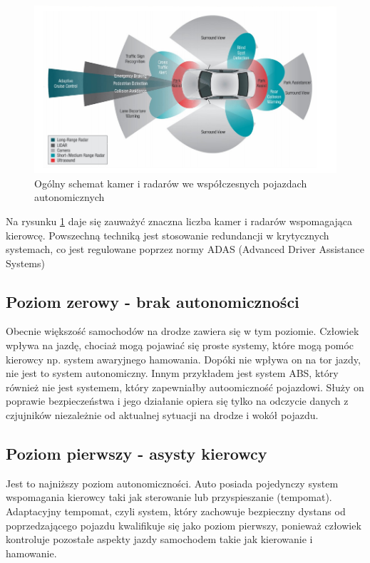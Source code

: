 \begin{figure}
  \centering
  \includegraphics[width=13cm]{img/systemy_autonomiczne_ogolnie.png}
  \caption{Ogólny schemat kamer i radarów we współczesnych pojazdach autonomicznych\cite{S1}}
  \label{fig:kamery_i_radary}
\end{figure}

Na rysunku \ref{fig:kamery_i_radary} daje się zauważyć znaczna liczba kamer i radarów wspomagająca kierowcę. Powszechną techniką jest stosowanie redundancji w krytycznych systemach, co jest regulowane poprzez normy ADAS (Advanced Driver Assistance Systems)

\subsection{Poziom zerowy - brak autonomiczności}
Obecnie większość samochodów na drodze zawiera się w tym poziomie. Człowiek wpływa na jazdę, chociaż mogą pojawiać się proste systemy, które mogą pomóc kierowcy np. system awaryjnego hamowania. Dopóki nie wpływa on na tor jazdy, nie jest to system autonomiczny. Innym przykładem jest system ABS, który również nie jest systemem, który zapewniałby autoomiczność pojazdowi. Służy on poprawie bezpieczeństwa i jego działanie opiera się tylko na odczycie danych z czjujników niezależnie od aktualnej sytuacji na drodze i wokół pojazdu.

\subsection{Poziom pierwszy - asysty kierowcy}
Jest to najniższy poziom autonomiczności. Auto posiada pojedynczy system wspomagania kierowcy taki jak sterowanie lub przyspieszanie (tempomat). Adaptacyjny tempomat, czyli system, który zachowuje bezpieczny dystans od poprzedzającego pojazdu kwalifikuje się jako poziom pierwszy, ponieważ człowiek kontroluje pozostałe aspekty jazdy samochodem takie jak kierowanie i hamowanie.

